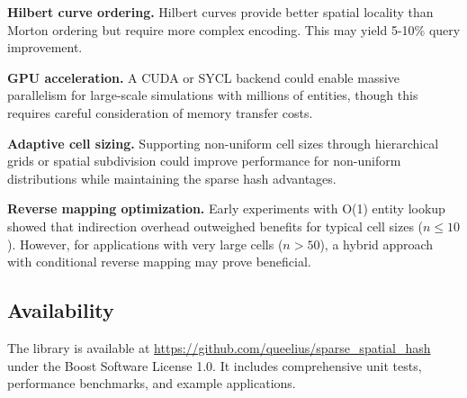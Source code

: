 \documentclass[11pt]{article}
\begin{document}
\textbf{Hilbert curve ordering.} Hilbert curves provide better spatial locality than Morton ordering but require more complex encoding. This may yield 5-10\% query improvement.

\textbf{GPU acceleration.} A CUDA or SYCL backend could enable massive parallelism for large-scale simulations with millions of entities, though this requires careful consideration of memory transfer costs.

\textbf{Adaptive cell sizing.} Supporting non-uniform cell sizes through hierarchical grids or spatial subdivision could improve performance for non-uniform distributions while maintaining the sparse hash advantages.

\textbf{Reverse mapping optimization.} Early experiments with O(1) entity lookup showed that indirection overhead outweighed benefits for typical cell sizes ($n \leq 10$). However, for applications with very large cells ($n > 50$), a hybrid approach with conditional reverse mapping may prove beneficial.

\subsection{Availability}

The library is available at \url{https://github.com/queelius/sparse_spatial_hash} under the Boost Software License 1.0. It includes comprehensive unit tests, performance benchmarks, and example applications.
\end{document}
